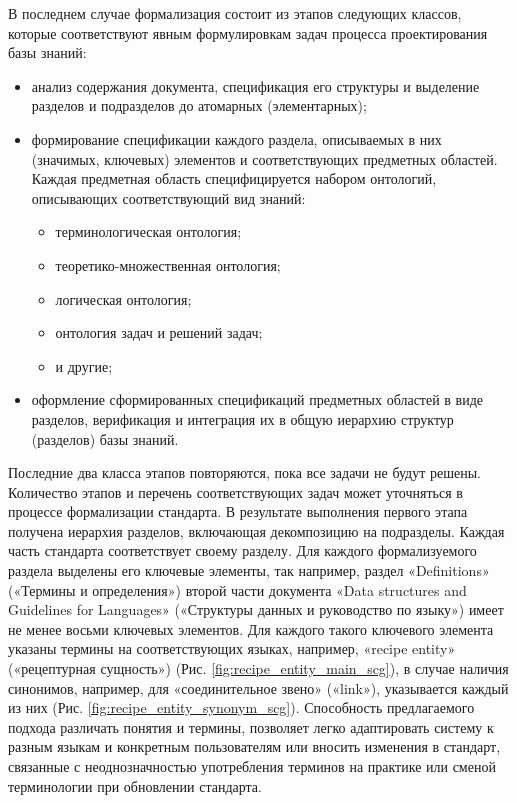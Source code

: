 В последнем случае формализация состоит из этапов следующих классов, которые соответствуют явным формулировкам задач процесса проектирования базы знаний:
\begin{itemize}
    \item анализ содержания документа, спецификация его структуры и выделение разделов и подразделов до атомарных (элементарных);
    \item формирование спецификации каждого раздела, описываемых в них (значимых, ключевых) элементов и соответствующих предметных областей. Каждая предметная область специфицируется набором онтологий, описывающих соответствующий вид знаний:
    \begin{itemize}
        \item терминологическая онтология;
        \item теоретико-множественная онтология;
        \item логическая онтология;
        \item онтология задач и решений задач;
        \item и другие;
    \end{itemize}
    \item оформление сформированных спецификаций предметных областей в виде разделов, верификация и интеграция их в общую иерархию структур (разделов) базы знаний.
\end{itemize}

Последние два класса этапов повторяются, пока все задачи не будут решены. Количество этапов и перечень соответствующих задач может уточняться в процессе формализации стандарта.
В результате выполнения первого этапа получена иерархия разделов, включающая декомпозицию на подразделы. Каждая часть стандарта соответствует своему разделу. Для каждого формализуемого раздела выделены его ключевые элементы, так например, раздел «Definitions» («Термины и определения») второй части документа «Data structures and Guidelines for Languages» («Структуры данных и руководство по языку») имеет не менее восьми ключевых элементов. Для каждого такого ключевого элемента указаны термины на соответствующих языках, например, «recipe entity» («рецептурная сущность») (Рис. \ref{fig:recipe_entity_main_scg}), в случае наличия синонимов, например, для «соединительное звено» («link»), указывается каждый из них (Рис. \ref {fig:recipe_entity_synonym_scg}). Способность предлагаемого подхода различать понятия и термины, позволяет легко адаптировать систему к разным языкам и конкретным пользователям или вносить изменения в стандарт, связанные с неоднозначностью употребления терминов на практике или сменой терминологии при обновлении стандарта.

